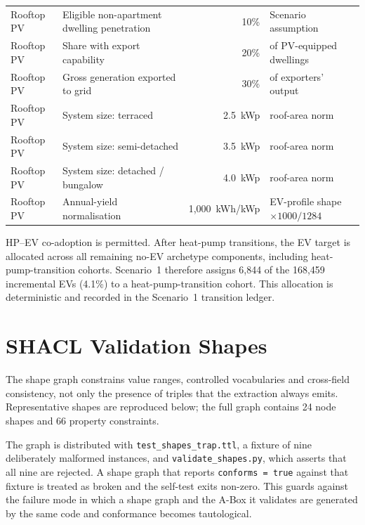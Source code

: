 \documentclass[preprint,12pt]{elsarticle}
\begin{document}
\begin{table}[H]
\begin{tabular}{llrl}
\midrule
Rooftop PV & Eligible non-apartment dwelling penetration & 10\% & Scenario assumption \\
Rooftop PV & Share with export capability           & 20\% & of PV-equipped dwellings \\
Rooftop PV & Gross generation exported to grid      & 30\% & of exporters' output \\
Rooftop PV & System size: terraced                  & 2.5~kWp & roof-area norm \\
Rooftop PV & System size: semi-detached             & 3.5~kWp & roof-area norm \\
Rooftop PV & System size: detached / bungalow       & 4.0~kWp & roof-area norm \\
Rooftop PV & Annual-yield normalisation             & 1,000~kWh/kWp & EV-profile shape $\times 1000/1284$ \\
\bottomrule
\end{tabular}
\end{table}

HP--EV co-adoption is permitted. After heat-pump transitions, the EV target
is allocated across all remaining no-EV archetype components, including
heat-pump-transition cohorts. Scenario~1 therefore assigns 6,844 of the
168,459 incremental EVs (4.1\%) to a heat-pump-transition cohort. This
allocation is deterministic and recorded in the Scenario~1 transition
ledger.


\section{SHACL Validation Shapes}
\label{app:shacl}

The shape graph constrains value ranges, controlled vocabularies and
cross-field consistency, not only the presence of triples that the
extraction always emits. Representative shapes are reproduced below; the
full graph contains 24 node shapes and 66 property constraints.

The graph is distributed with \texttt{test\_shapes\_trap.ttl}, a fixture of
nine deliberately malformed instances, and \texttt{validate\_shapes.py},
which asserts that all nine are rejected. A shape graph that reports
\texttt{conforms = true} against that fixture is treated as broken and the
self-test exits non-zero. This guards against the failure mode in which a
shape graph and the A-Box it validates are generated by the same code and
conformance becomes tautological.
\end{document}
